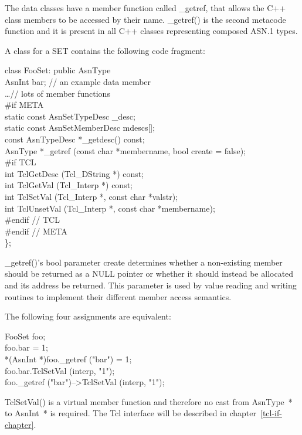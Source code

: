 The data classes have a member function called {\C \_getref}, that allows the C++ class members to be accessed by their name.
{\C \_getref()} is the second metacode function and it is present in all C++ classes representing composed ASN.1 types.

A class for a SET contains the following code fragment:
\begin{Ccode}
class FooSet: public AsnType\+\\
  AsnInt	\>\>bar; // an example data member\\
  \dots // lots of member functions\\
\<\#if META\\
  static const AsnSetTypeDesc   \>\>\_desc;\\
  static const AsnSetMemberDesc \>\>mdescs[];\\
  const AsnTypeDesc             \>\>*\_getdesc() const;\\
  AsnType                       \>\>*\_getref (const char *membername, bool create = false);\\
\<\#if TCL\\
  int                \>\>TclGetDesc (Tcl\_DString *) const;\\
  int                \>\>TclGetVal (Tcl\_Interp *) const;\\
  int                \>\>TclSetVal (Tcl\_Interp *, const char *valstr);\\
  int                \>\>TclUnsetVal (Tcl\_Interp *, const char *membername);\-\\
\#endif // TCL \\
\#endif // META\\
\};
\end{Ccode}

{\C \_getref()}'s {\C bool} parameter {\C create} determines whether a non-existing member should be returned as a {\C NULL} pointer or whether it should instead be allocated and its address be returned.
This parameter is used by value reading and writing routines to implement their different member access semantics.

The following four assignments are equivalent:
\begin{Ccode}
FooSet foo;\\
foo.bar = 1;\\
*(AsnInt *)foo.\_getref ("bar") = 1;\\
foo.bar.TclSetVal (interp, "1");\\
foo.\_getref ("bar")-->TclSetVal (interp, "1");
\end{Ccode}
{\C TclSetVal()} is a virtual member function and therefore no cast from {\C AsnType~*} to {\C AsnInt~*} is required.
The Tcl interface will be described in chapter~\ref{tcl-if-chapter}.

